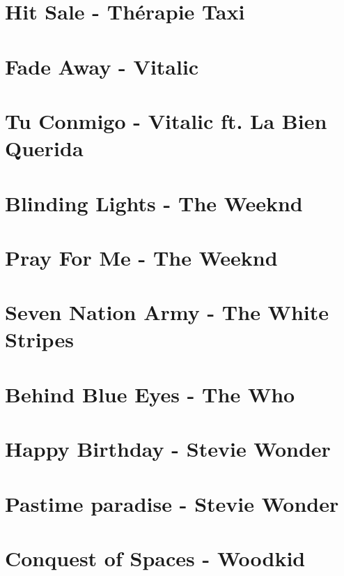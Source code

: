 \documentclass[11pt]{article}
\begin{document}
\section{Hit Sale - Thérapie Taxi}
\begin{guitar}

\end{guitar}

\section{Fade Away - Vitalic}


\section{Tu Conmigo - Vitalic ft. La Bien Querida}


\section{Blinding Lights - The Weeknd}
\begin{guitar}

\end{guitar}

\section{Pray For Me - The Weeknd}
\begin{guitar}

\end{guitar}

\section{Seven Nation Army - The White Stripes}



\section{Behind Blue Eyes - The Who}
\begin{guitar}

\end{guitar}

\section{Happy Birthday - Stevie Wonder}
\begin{guitar}

\end{guitar}



\section{Pastime paradise - Stevie Wonder}
\begin{guitar}

\end{guitar}





\section{Conquest of Spaces - Woodkid}
\begin{guitar}

\end{guitar}
\end{document}
